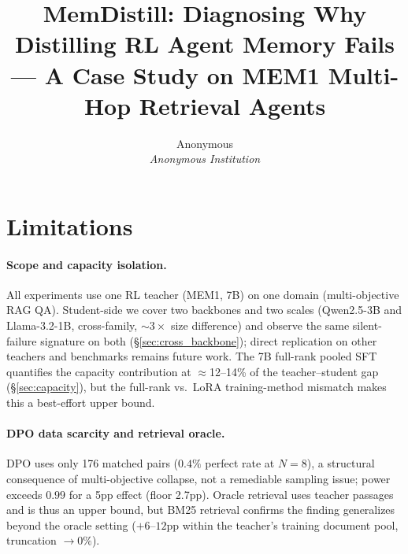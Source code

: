 \documentclass[11pt]{article}
\title{MemDistill: Diagnosing Why Distilling RL Agent Memory Fails --- A Case Study on MEM1 Multi-Hop Retrieval Agents}
\author{
  Anonymous \\
  \textit{Anonymous Institution}
}
\begin{document}
\maketitle









\section*{Limitations}
\label{sec:limitations}

\paragraph{Scope and capacity isolation.}
All experiments use one RL teacher (MEM1, 7B) on one domain (multi-objective RAG QA). Student-side we cover two backbones and two scales (Qwen2.5-3B and Llama-3.2-1B, cross-family, ${\sim}3\times$ size difference) and observe the same silent-failure signature on both (\S\ref{sec:cross_backbone}); direct replication on other teachers and benchmarks remains future work. The 7B full-rank pooled SFT quantifies the capacity contribution at $\approx$12--14\% of the teacher--student gap (\S\ref{sec:capacity}), but the full-rank vs.\ LoRA training-method mismatch makes this a best-effort upper bound.

\paragraph{DPO data scarcity and retrieval oracle.}
DPO uses only 176 matched pairs ($0.4\%$ perfect rate at $N\!=\!8$), a structural consequence of multi-objective collapse, not a remediable sampling issue; power exceeds $0.99$ for a 5pp effect (floor 2.7pp). Oracle retrieval uses teacher passages and is thus an upper bound, but BM25 retrieval confirms the finding generalizes beyond the oracle setting ($+6$--$12$pp within the teacher's training document pool, truncation $\to 0\%$).
\end{document}
